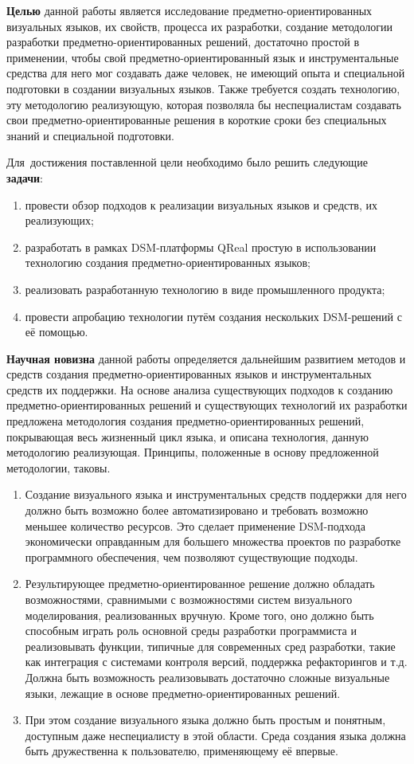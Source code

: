 \textbf{Целью} данной работы является исследование предметно-ориентированных 
визуальных языков, их свойств, процесса их разработки, создание методологии 
разработки предметно-ориентированных решений, достаточно простой в применении, 
чтобы свой предметно-ориентированный язык и инструментальные средства для него 
мог создавать даже человек, не имеющий опыта и специальной подготовки в создании 
визуальных языков. Также требуется создать технологию, эту методологию 
реализующую, которая позволяла бы неспециалистам создавать свои 
предметно-ориентированные решения в короткие сроки без специальных знаний и 
специальной подготовки. 

Для~достижения поставленной цели необходимо было решить следующие \textbf{задачи}:
\begin{enumerate}
	\item провести обзор подходов к реализации визуальных языков и средств, их реализующих;
	\item разработать в рамках DSM-платформы QReal простую в использовании технологию создания предметно-ориентированных языков;
	\item реализовать разработанную технологию в виде промышленного продукта;
	\item провести апробацию технологии путём создания нескольких DSM-решений с её помощью.
\end{enumerate}

\textbf{Научная новизна} данной работы определяется дальнейшим развитием методов и 
средств создания предметно-ориентированных языков и инструментальных средств их 
поддержки. На основе анализа существующих подходов к созданию 
предметно-ориентированных решений и существующих технологий их разработки 
предложена методология создания предметно-ориентированных решений, покрывающая 
весь жизненный цикл языка, и описана технология, данную методологию реализующая. 
Принципы, положенные в основу предложенной методологии, таковы.
\begin{enumerate}
	\item Создание визуального языка и инструментальных средств поддержки для него 
		должно быть возможно более автоматизировано и требовать возможно меньшее 
		количество ресурсов. Это сделает применение DSM-подхода экономически 
		оправданным для большего множества проектов по разработке программного 
		обеспечения, чем позволяют существующие подходы.
	\item Результирующее предметно-ориентированное решение должно обладать 
		возможностями, сравнимыми с возможностями систем визуального моделирования, 
		реализованных вручную. Кроме того, оно должно быть способным играть 
		роль основной среды разработки программиста и реализовывать функции, 
		типичные для современных сред разработки, такие как интеграция с системами 
		контроля версий, поддержка рефакторингов и т.д. Должна быть возможность 
		реализовывать достаточно сложные визуальные языки, лежащие в основе 
		предметно-ориентированных решений.
	\item При этом создание визуального языка должно быть простым и понятным, 
		доступным даже неспециалисту в этой области. Среда создания языка должна 
		быть дружественна к пользователю, применяющему её впервые.
\end{enumerate}

